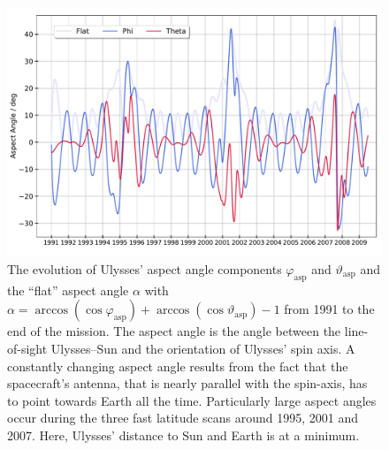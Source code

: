 \begin{figure}[h]
	\includegraphics[width=1\textwidth]{Figures/aaa.pdf}
	\centering
	\caption{The evolution of Ulysses' aspect angle components $\varphi_{\mathrm{asp}}$ and $\vartheta_{\mathrm{asp}}$ and the ``flat'' aspect angle $\alpha$ with  $\alpha = \arccos(\cos{\varphi_{\mathrm{asp}}}) + \arccos(\cos{\vartheta_{\mathrm{asp}}}) -1$ from 1991 to the end of the mission. The aspect angle is the angle between the line-of-sight Ulysses--Sun and the orientation of Ulysses' spin axis. A constantly changing aspect angle results from the fact that the spacecraft's antenna, that is nearly parallel with the spin-axis, has to point towards Earth all the time. Particularly large aspect angles occur during the three fast latitude scans around 1995, 2001 and 2007. Here, Ulysses' distance to Sun and Earth is at a minimum.}
	\label{fig:aa}
\end{figure}


